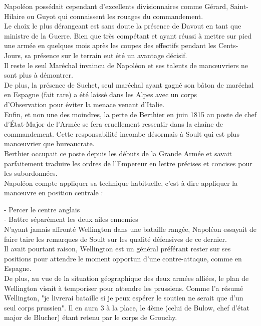 Napoléon possédait cependant d'excellents divisionnaires comme Gérard, Saint-Hilaire ou Guyot qui 
connaissent les rouages du commandement. \\
Le choix le plus dérangeant est sans doute la présence de Davout en tant que ministre de la Guerre. 
Bien que très compétant et ayant réussi à mettre sur pied une armée en quelques mois après les coupes 
des effectifs pendant les Cents-Jours, sa présence sur le terrain eut été un avantage décisif.\\
Il reste le seul Maréchal invaincu de Napoléon et ses talents de manœuvriers ne sont plus à démontrer. \\
De plus, la présence de Suchet, seul maréchal ayant gagné son bâton de maréchal en Espagne (fait rare) 
a été laissé dans les Alpes avec un corps \\d'Observation pour éviter la menace venant d'Italie.\\
Enfin, et non une des moindres, la perte de Berthier en juin 1815 au poste de chef d'État-Major de l'Armée 
se fera cruellement ressentir dans la chaîne de commandement. Cette responsabilité incombe désormais à 
Soult qui est plus manœuvrier que bureaucrate.\\
Berthier occupait ce poste depuis les débuts de la Grande Armée et savait parfaitement traduire les 
ordres de l'Empereur en lettre précises et concises pour les subordonnées.\\

Napoléon compte appliquer sa technique habituelle, c'est à dire appliquer la manœuvre en position centrale :

- Percer le centre anglais\\

- Battre séparément les deux ailes ennemies\\

N'ayant jamais affronté Wellington dans une bataille rangée, Napoléon essayait de faire taire les 
remarques de Soult sur les qualité défensives de ce dernier. \\
Il avait pourtant raison, Wellington est un général préférant rester sur ses positions pour attendre le 
moment opportun d'une contre-attaque, comme en Espagne.\\
De plus, au vue de la situation géographique des deux armées alliées, le plan de Wellington visait à 
temporiser pour attendre les prussiens. Comme l'a résumé Wellington, "je livrerai bataille si je peux espérer le soutien ne serait que d'un seul corps prussien".
Il en aura 3 à la place, le 4ème (celui de Bulow, chef d'état major de Blucher) étant retenu par le corps de Grouchy.\\



